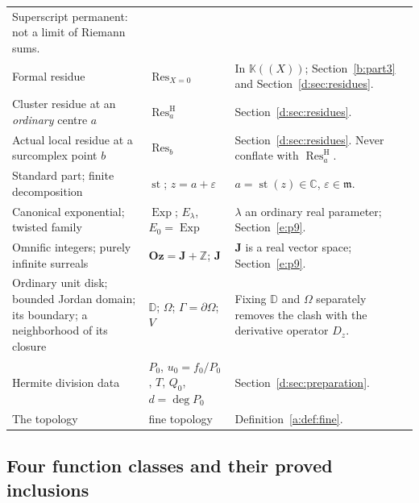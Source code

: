\documentclass[11pt,a4paper]{article}
\numberwithin{equation}{section}
\theoremstyle{definition}
\theoremstyle{remark}
\theoremstyle{plain}
\newcommand{\K}{\mathbb K}
\newcommand{\Oz}{\mathbf{Oz}}
\newcommand{\Jpi}{\mathbf J}
\newcommand{\CC}{\mathbb C}
\newcommand{\ZZ}{\mathbb Z}
\newcommand{\mm}{\mathfrak m}
\DeclareMathOperator{\st}{st}
\DeclareMathOperator{\Exp}{Exp}
\DeclareMathOperator{\Res}{Res}                 %
\newcommand{\ResH}[1]{\Res^{\mathrm H}_{#1}}    %
\newcommand{\Resat}[1]{\Res_{#1}}               %
\begin{document}
\begin{longtable}{@{}p{}p{}p{}@{}}
 Superscript permanent: not a limit of Riemann sums.\\
Formal residue & $\Res_{X=0}$ & In $\K((X))$; Section~\ref{b:part3} and Section~\ref{d:sec:residues}.\\
Cluster residue at an \emph{ordinary} centre $a$ & $\ResH a$ &
 Section~\ref{d:sec:residues}.\\
Actual local residue at a surcomplex point $b$ & $\Resat b$ &
 Section~\ref{d:sec:residues}.  Never conflate with $\ResH a$.\\
Standard part; finite decomposition & $\st$; $z=a+\varepsilon$ &
 $a=\st(z)\in\CC$, $\varepsilon\in\mm$.\\
Canonical exponential; twisted family & $\Exp$; $E_\lambda$, $E_0=\Exp$ &
 $\lambda$ an ordinary real parameter; Section~\ref{e:p9}.\\
Omnific integers; purely infinite surreals & $\Oz=\Jpi+\ZZ$; $\Jpi$ &
 $\Jpi$ is a real vector space; Section~\ref{e:p9}.\\
Ordinary unit disk; bounded Jordan domain; its boundary; a neighborhood
 of its closure & $\mathbb D$; $\Omega$; $\Gamma=\partial\Omega$; $V$ &
 Fixing $\mathbb D$ and $\Omega$ separately removes the clash with the
 derivative operator $D_z$.\\
Hermite division data & $P_0$, $u_0=f_0/P_0$, $T$, $Q_0$, $d=\deg P_0$ &
 Section~\ref{d:sec:preparation}.\\
The topology & fine topology &
 Definition~\ref{a:def:fine}.\\
\end{longtable}
\endgroup

\subsection{Four function classes and their proved inclusions}\label{a:def:classes}
\end{document}
